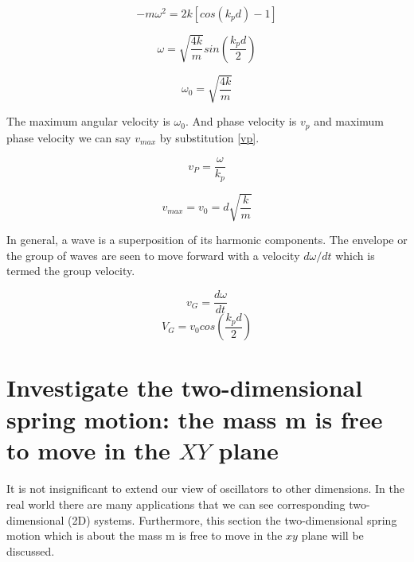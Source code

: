 \begin{equation}
    -m\omega^2 = 2k[cos(k_pd)-1]
\end{equation}

\begin{equation}
    \omega = \sqrt{\frac{4k}{m}}sin(\frac{k_pd}{2})
\end{equation}

\begin{equation}
    \omega_0 = \sqrt{\frac{4k}{m}}
\end{equation}

The maximum angular velocity is $\omega_0$. And  phase velocity is $v_p$ and maximum phase velocity we can say $v_{max}$ by substitution \eqref{vp}. 

\begin{equation}
\label{vp}
    v_P = \frac{\omega}{k_p}
\end{equation}

\begin{equation}
    v_{max} = v_0 = d\sqrt{\frac{k}{m}}
\end{equation}

In general, a wave is a superposition of its harmonic components. The envelope or the group of waves are seen to move forward with a velocity $d\omega /  dt$ which is termed the group velocity. 

\begin{equation}
    v_G = \frac{d\omega}{dt}
\end{equation}
\begin{equation}
    V_G = v_0 cos(\frac{k_p d}{2})
\end{equation}

\newpage

\section{Investigate  the two-dimensional spring motion: the mass m is free to move in the $XY$ plane}
\label{XY}
\paragraph{}

It is not insignificant to extend our view of oscillators to other dimensions. In the real world there are many applications that we can see corresponding two-dimensional (2D) systems. Furthermore, this section the two-dimensional spring motion which is about the mass m is free to move in the $xy$ plane will be discussed.

